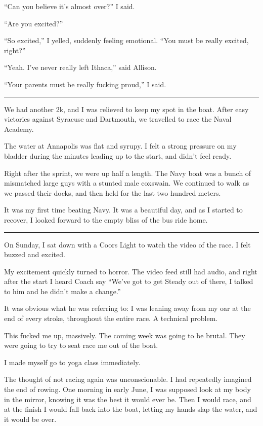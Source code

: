 ``Can you believe it's almost over?'' I said.

``Are you excited?''

``So excited,'' I yelled, suddenly feeling emotional.  ``You must be
really excited, right?''

``Yeah.  I've never really left Ithaca,'' said Allison.

``Your parents must be really fucking proud,'' I said.

\plainfancybreak{12pt}{2}{}

We had another 2k, and I was relieved to keep my spot in the boat.  After easy
victories against Syracuse and Dartmouth, we travelled to race the Naval
Academy.  

The water at Annapolis was flat and syrupy.  I felt a strong pressure on my
bladder during the minutes leading up to the start, and didn't feel ready.

Right after the sprint, we were up half a length.  The Navy boat was a bunch of
mismatched large guys with a stunted male coxswain.  We continued to walk as we
passed their docks, and then held for the last two hundred meters.

It was my first time beating Navy.  It was a beautiful day, and as I started to
recover, I looked forward to the empty bliss of the bus ride home.

\plainfancybreak{12pt}{2}{}

On Sunday, I sat down with a Coors Light to watch the video of the race.  I felt
buzzed and excited. 

My excitement quickly turned to horror.  The video feed still had audio, and
right after the start I heard Coach say ``We've got to get Steady out of there,
I talked to him and he didn't make a change.''  

It was obvious what he was referring to: I was leaning away from my oar at the
end of every stroke, throughout the entire race.  A technical problem.

This fucked me up, massively.  The coming week was going to be brutal.  They
were going to try to seat race me out of the boat.

I made myself go to yoga class immediately.  

The thought of not racing again was unconscionable.  I had repeatedly imagined
the end of rowing.  One morning in early June, I was supposed look at my body in
the mirror, knowing it was the best it would ever be.  Then I would race, and at
the finish I would fall back into the boat, letting my hands slap the water, and
it would be over.

